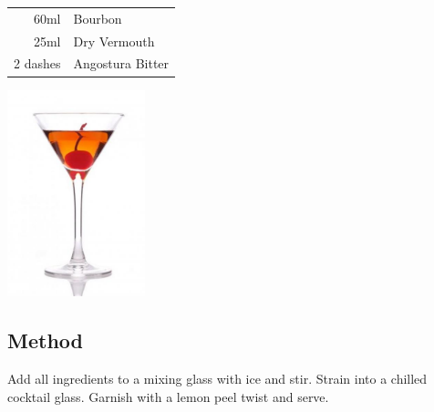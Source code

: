 \documentclass[12pt, letterpaper]{article}
\begin{document}
\begin{multicols}{2}

\begin{tabular} { r | l}
    60ml & Bourbon \\
    25ml & Dry Vermouth \\
    2 dashes & Angostura Bitter \\
\end{tabular}

\includegraphics[height=6cm]{manhattandry}

\end{multicols}

\subsection*{Method}
Add all ingredients to a mixing glass with ice and stir. Strain into a chilled cocktail glass. 
Garnish with a lemon peel twist and serve.
\end{document}
